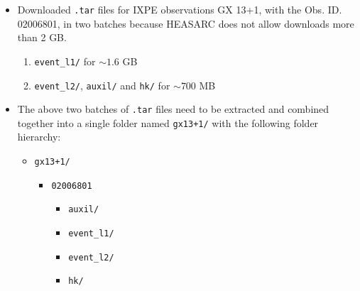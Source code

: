 	\begin{itemize}
		\item Downloaded \verb|.tar| files for IXPE observations GX 13+1, with the Obs. ID. 02006801, in two batches because HEASARC does not allow downloads more than 2 GB.
        \begin{enumerate}
            \item \verb|event_l1/| for $\sim 1.6$ GB
            \item \verb|event_l2/|, \verb|auxil/| and \verb|hk/| for $\sim 700$ MB
        \end{enumerate}

        \item The above two batches of \verb|.tar| files need to be extracted and combined together into a single folder named \verb|gx13+1/| with the following folder hierarchy:
        \begin{itemize}
            \item \verb|gx13+1/|
            \begin{itemize}
                \item \verb|02006801|
                \begin{itemize}
                    \item \verb|auxil/|
                    \item \verb|event_l1/|
                    \item \verb|event_l2/|
                    \item \verb|hk/|
                \end{itemize}
            \end{itemize}
        \end{itemize}
	\end{itemize}